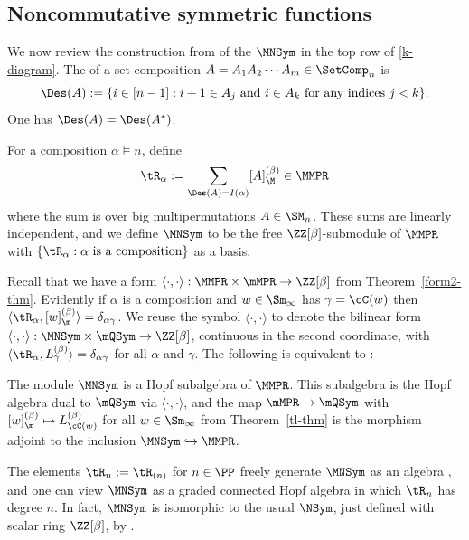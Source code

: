  

\subsection{Noncommutative symmetric functions}

We now review the construction from \cite{LamPyl} of the   $\MNSym$
 in the top row of \eqref{k-diagram}.
%
The  of a set composition $A = A_1 A_2\cdots A_m \in \SetComp_n$
is 
\[\Des(A) := \{ i  \in [n-1]: i+1 \in A_j\text{ and }i \in A_k\text{ for any indices }j<k\}.\]
One has $\Des(A) = \Des(A^*)$.

\begin{definition}
For a composition $\alpha \vDash n$,
define
\[
\tR_\alpha := \sum_{\Des(A) =I(\alpha) } [A]^{(\beta)}_\M \in \MMPR
\]
where the sum is over big multipermutations $A \in \SM_n$.
These sums are linearly independent, and we
 define $\MNSym$ to be the free $\ZZ[\beta]$-submodule of $\MMPR$
with $\left\{\tR_\alpha : \alpha \text{ is a composition} \right\}$ as a basis.
\end{definition}

 

Recall that we have a form 
$\langle\cdot,\cdot\rangle : \MMPR \times \mMPR\to \ZZ[\beta]$
from Theorem~\ref{form2-thm}.
Evidently if $\alpha$ is a composition and $w \in \Sm_\infty$ has $\gamma = \cC(w)$  
then  $\langle \tR_{\alpha},[w]^{(\beta)}_\m\rangle= \delta_{\alpha\gamma}$.
We reuse the symbol $\langle \cdot,\cdot\rangle $ 
to denote the bilinear form $\langle \cdot,\cdot\rangle : \MNSym \times \mQSym \to \ZZ[\beta]$, continuous in the second coordinate,
 with
$ \langle \tR_{\alpha}, L^{(\beta)}_{\gamma} \rangle = \delta_{\alpha\gamma}$ for all $\alpha$ and $\gamma$.
The following is equivalent to \cite[Thm.~8.4]{LamPyl}:


\begin{theorem}
\label{form3-thm}
The module $\MNSym$ is a Hopf subalgebra of $\MMPR$. This subalgebra is the Hopf algebra 
dual to $\mQSym$ via $\langle \cdot,\cdot\rangle $, and the  map $\mMPR \to \mQSym$ 
with 
 $[w]^{(\beta)}_\m \mapsto L^{(\beta)}_{\cC(w)}$ for all $w \in \Sm_\infty$
from Theorem~\ref{tl-thm}
is the morphism adjoint to 
the inclusion
$\MNSym \hookrightarrow \MMPR$.
\end{theorem}


The elements $\tR_{n}:=\tR_{(n)}$ for $n \in \PP$
 freely generate $\MNSym$ as an algebra \cite[Prop.~8.3]{LamPyl},
and one can view $\MNSym$ as a graded connected Hopf algebra in which $\tR_{n}$ has degree $n$.
 In fact, $\MNSym$ is
isomorphic to the usual   $\NSym$, just defined with scalar ring $\ZZ[\beta]$, by
 \cite[Prop.~8.5]{LamPyl}.

